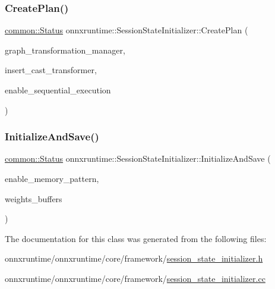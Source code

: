 \subsubsection{\texorpdfstring{Create\+Plan()}{CreatePlan()}}
{\footnotesize\ttfamily \mbox{\hyperlink{classonnxruntime_1_1common_1_1Status}{common\+::\+Status}} onnxruntime\+::\+Session\+State\+Initializer\+::\+Create\+Plan (\begin{DoxyParamCaption}\item[{const \mbox{\hyperlink{classonnxruntime_1_1GraphTransformerManager}{onnxruntime\+::\+Graph\+Transformer\+Manager}} \&}]{graph\+\_\+transformation\+\_\+manager,  }\item[{const \mbox{\hyperlink{classonnxruntime_1_1InsertCastTransformer}{Insert\+Cast\+Transformer}} \&}]{insert\+\_\+cast\+\_\+transformer,  }\item[{bool}]{enable\+\_\+sequential\+\_\+execution }\end{DoxyParamCaption})}

\mbox{\label{classonnxruntime_1_1SessionStateInitializer_a98d629f31578b01f30aa3a176eadd52c}} 
\subsubsection{\texorpdfstring{Initialize\+And\+Save()}{InitializeAndSave()}}
{\footnotesize\ttfamily \mbox{\hyperlink{classonnxruntime_1_1common_1_1Status}{common\+::\+Status}} onnxruntime\+::\+Session\+State\+Initializer\+::\+Initialize\+And\+Save (\begin{DoxyParamCaption}\item[{bool}]{enable\+\_\+memory\+\_\+pattern,  }\item[{std\+::map$<$ \mbox{\hyperlink{structONNXRuntimeAllocatorInfo}{O\+N\+N\+X\+Runtime\+Allocator\+Info}}, \mbox{\hyperlink{namespaceonnxruntime_acd830c816d6e0699b671f8ba79bb48f9}{Buffer\+Unique\+Ptr}} $>$ \&}]{weights\+\_\+buffers }\end{DoxyParamCaption})}



The documentation for this class was generated from the following files\+:\begin{DoxyCompactItemize}
\item 
onnxruntime/onnxruntime/core/framework/\mbox{\hyperlink{session__state__initializer_8h}{session\+\_\+state\+\_\+initializer.\+h}}\item 
onnxruntime/onnxruntime/core/framework/\mbox{\hyperlink{session__state__initializer_8cc}{session\+\_\+state\+\_\+initializer.\+cc}}\end{DoxyCompactItemize}
